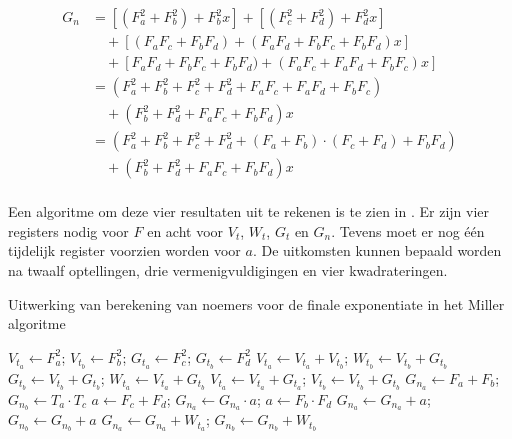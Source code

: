 \[\begin{aligned}
G_n	&= [(F_a^2 + F_b^2) + F_b^2 x] + [(F_c^2 + F_d^2) + F_d^2x]\\
			&\quad + [(F_a F_c + F_b F_d) + (F_a F_d + F_b F_c + F_b F_d)x]\\
			&\quad + [F_a F_d + F_b F_c + F_b F_d) + (F_a F_c + F_a F_d + F_b F_c)x]\\
		&= (F_a^2 + F_b^2 + F_c^2 + F_d^2 + F_a F_c + F_a F_d + F_b F_c)\\
			&\quad + (F_b^2 + F_d^2 + F_a F_c + F_b F_d)x\\
		&= (F_a^2 + F_b^2 + F_c^2 + F_d^2 + (F_a + F_b) \cdot (F_c + F_d) + F_b F_d)\\
			&\quad + (F_b^2 + F_d^2 + F_a F_c + F_b F_d)x\\
\end{aligned}\]

Een algoritme om deze vier resultaten uit te rekenen is te zien in . Er zijn vier registers nodig voor $F$ en acht voor $V_t$, $W_t$, $G_t$ en $G_n$. Tevens moet er nog \'e\'en tijdelijk register voorzien worden voor $a$. De uitkomsten kunnen bepaald worden na twaalf optellingen, drie vermenigvuldigingen en vier kwadrateringen.

\begin{algorithm}[h]
	\caption{Uitwerking van berekening van noemers voor de finale exponentiate in het Miller algoritme}
	\label{algoritme-implementatie-miller-final-noemers}
	$V_{t_a} \leftarrow F_a^2$; $V_{t_b} \leftarrow F_b^2$; $G_{t_a} \leftarrow F_c^2$; $G_{t_b} \leftarrow F_d^2$\;
	$V_{t_a} \leftarrow V_{t_a} + V_{t_b}$; $W_{t_b} \leftarrow V_{t_b} + G_{t_b}$\;
	$G_{t_b} \leftarrow V_{t_b} + G_{t_b}$; $W_{t_a} \leftarrow V_{t_a} + G_{t_b}$\;
	$V_{t_a} \leftarrow V_{t_a} + G_{t_a}$; $V_{t_b} \leftarrow V_{t_b} + G_{t_b}$\;
	$G_{n_a} \leftarrow F_a + F_b$; $G_{n_b} \leftarrow T_a \cdot T_c$\;
	$a \leftarrow F_c + F_d$; $G_{n_a} \leftarrow G_{n_a} \cdot a$; $a \leftarrow F_b \cdot F_d$\;
	$G_{n_a} \leftarrow G_{n_a} + a$; $G_{n_b} \leftarrow G_{n_b} + a$\;
	$G_{n_a} \leftarrow G_{n_a} + W_{t_a}$; $G_{n_b} \leftarrow G_{n_b} + W_{t_b}$\;
\end{algorithm}

